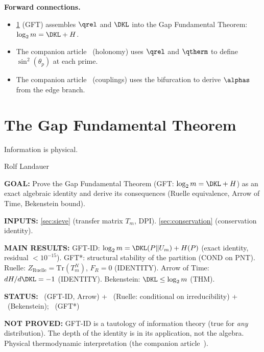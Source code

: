 \documentclass[12pt,a4paper]{article}
\begin{document}
\medskip\noindent\textbf{Forward connections.}
\begin{itemize}
\item \cref{sec:gft} (GFT) assembles $\qrel$ and $\DKL$ into the Gap
  Fundamental Theorem: $\log_2 m = \DKL + H$.
\item The companion article~\cite{companion_M2} (holonomy) uses $\qrel$ and $\qtherm$ to define
  $\sin^2(\theta_p)$ at each prime.
\item The companion article~\cite{companion_M5} (couplings) uses the bifurcation to derive
  $\alphas$ from the edge branch.
\end{itemize}


\section{The Gap Fundamental Theorem}
\label{sec:gft}

\epigraph{Information is physical.}{Rolf Landauer}

\begin{statusbox}
\textbf{GOAL:}
  Prove the Gap Fundamental Theorem (GFT: $\log_2 m = \DKL + H$)
  as an exact algebraic identity and derive its consequences
  (Ruelle equivalence, Arrow of Time, Bekenstein bound).

\textbf{INPUTS:}
  \cref{sec:sieve} (transfer matrix $T_m$, DPI). \cref{sec:conservation} (conservation identity).

\textbf{MAIN RESULTS:}
  GFT-ID: $\log_2 m = \DKL(P\|U_m) + H(P)$ (exact identity, residual $<10^{-15}$).
  GFT*: structural stability of the partition (COND on PNT).
  Ruelle: $Z_{\mathrm{Ruelle}} = \mathrm{Tr}(T_m^N)$, $F_R = 0$ (IDENTITY).
  Arrow of Time: $dH/d\DKL = -1$ (IDENTITY).
  Bekenstein: $\DKL \leq \log_2 m$ (THM).

\textbf{STATUS:}
  \IDTAG~(GFT-ID, Arrow) + \CONDTAG~(Ruelle: conditional on irreducibility) + \THMTAG~(Bekenstein); \CONDTAG~(GFT*)

\textbf{NOT PROVED:}
  GFT-ID is a tautology of information theory (true for \emph{any} distribution).
  The depth of the identity is in its application, not the algebra.
  Physical thermodynamic interpretation (the companion article~\cite{companion_M5}).
\end{statusbox}
\end{document}
